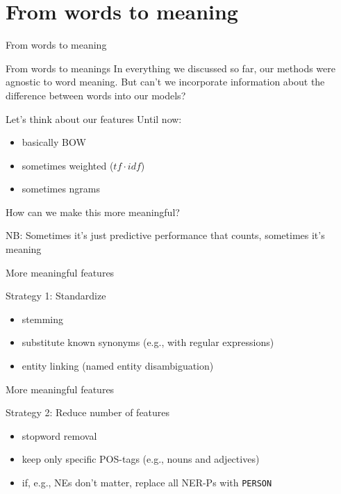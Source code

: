 \documentclass{beamer}
\begin{document}
\section{From words to meaning}

\begin{frame}[plain]
From words to meaning
\end{frame}


\begin{frame}{From words to meanings}
In everything we discussed so far, our methods were agnostic to word meaning. But can't we incorporate information about the difference between words into our models?
\end{frame}

\begin{frame}{Let's think about our features}
Until now:
\begin{itemize}
	\item basically BOW
	\item sometimes weighted ($tf\cdot idf$)
	\item sometimes ngrams
\end{itemize}

\pause
How can we make this more meaningful?


\footnotesize
NB: Sometimes it's just predictive performance that counts, sometimes it's meaning

\end{frame}

\begin{frame}{More meaningful features}
\begin{block}{Strategy 1: Standardize}
\begin{itemize}
	\item stemming
	\item substitute known synonyms (e.g., with regular expressions)
	\item entity linking (named entity disambiguation)
\end{itemize}
\end{block}
\end{frame}




\begin{frame}{More meaningful features}
\begin{block}{Strategy 2: Reduce number of features}
	\begin{itemize}
		\item stopword removal
		\item keep only specific POS-tags (e.g., nouns and adjectives)
		\item if, e.g., NEs don't matter, replace all NER-Ps with \texttt{PERSON}
	\end{itemize}
\end{block}
\end{frame}
\end{document}
